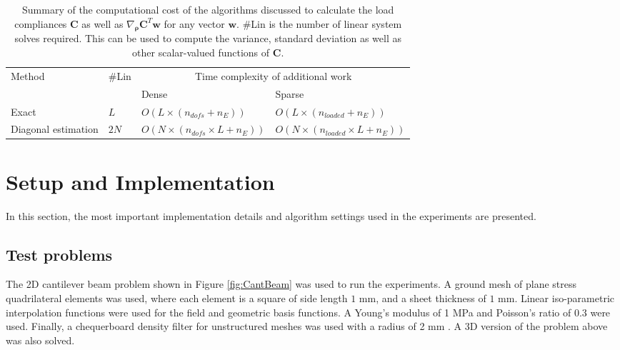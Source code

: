     \begin{table}
        \centering
        \caption{Summary of the computational cost of the algorithms discussed to calculate the load compliances $\bm{C}$ as well as $\nabla_{\bm{\rho}} \bm{C}^T \bm{w}$ for any vector $\bm{w}$. \#Lin is the number of linear system solves required. This can be used to compute the variance, standard deviation as well as other scalar-valued functions of $\bm{C}$.}
        \begin{tabular}{|m{4cm} | m{0.7cm} | m{4cm} | m{5cm} |} 
         \hline
         \multirow{2}{3em}{Method} & \multirow{2}{2em}{\#Lin} & \multicolumn{2}{c|}{Time complexity of additional work} \\\cline{3-4}
         & & Dense & Sparse \\
         \hline
         \hline
         Exact & \(L\) & \(O(L \times (n_{dofs} + n_E))\) & \(O(L \times (n_{loaded} + n_E))\) \\
         \hline
         Diagonal estimation & \(2N\) & \(O(N \times (n_{dofs} \times L + n_E))\) & \(O(N \times (n_{loaded} \times L + n_E))\) \\
        \hline
       \end{tabular}
       \label{tab:perf_scalar}
    \end{table}

\section{Setup and Implementation} \label{sec:exp_impl}

  In this section, the most important implementation details and algorithm settings used in the experiments are presented.

  \subsection{Test problems}

    

    The 2D cantilever beam problem shown in Figure \ref{fig:CantBeam} was used to run the experiments. A ground mesh of plane stress quadrilateral elements was used, where each element is a square of side length $1 \text{ mm}$, and a sheet thickness of $1 \text{ mm}$. Linear iso-parametric interpolation functions were used for the field and geometric basis functions. A Young's modulus of 1 MPa and Poisson's ratio of 0.3 were used. Finally, a chequerboard density filter for unstructured meshes was used with a radius of 2 mm \citep{Huang2010a}. A 3D version of the problem above was also solved.

